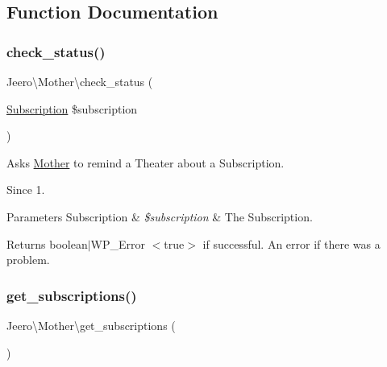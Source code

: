\subsection{Function Documentation}
\mbox{\label{namespaceJeero_1_1Mother_ad8898f9d86248f6c1999c6bed607a939}} 
\subsubsection{\texorpdfstring{check\+\_\+status()}{check\_status()}}
{\footnotesize\ttfamily Jeero\textbackslash{}\+Mother\textbackslash{}check\+\_\+status (\begin{DoxyParamCaption}\item[{\hyperlink{classJeero_1_1Subscriptions_1_1Subscription}{Subscription}}]{\$subscription }\end{DoxyParamCaption})}

Asks \hyperlink{namespaceJeero_1_1Mother}{Mother} to remind a Theater about a Subscription.

\begin{DoxySince}{Since}
1. 
\end{DoxySince}

\begin{DoxyParams}[1]{Parameters}
Subscription & {\em \$subscription} & The Subscription. \\
\hline
\end{DoxyParams}
\begin{DoxyReturn}{Returns}
boolean$\vert$\+W\+P\+\_\+\+Error $<$true$>$ if successful. An error if there was a problem. 
\end{DoxyReturn}
\mbox{\label{namespaceJeero_1_1Mother_af3a7a0928f56dae13cf5380a264e8a91}} 
\subsubsection{\texorpdfstring{get\+\_\+subscriptions()}{get\_subscriptions()}}
{\footnotesize\ttfamily Jeero\textbackslash{}\+Mother\textbackslash{}get\+\_\+subscriptions (\begin{DoxyParamCaption}{ }\end{DoxyParamCaption})}

